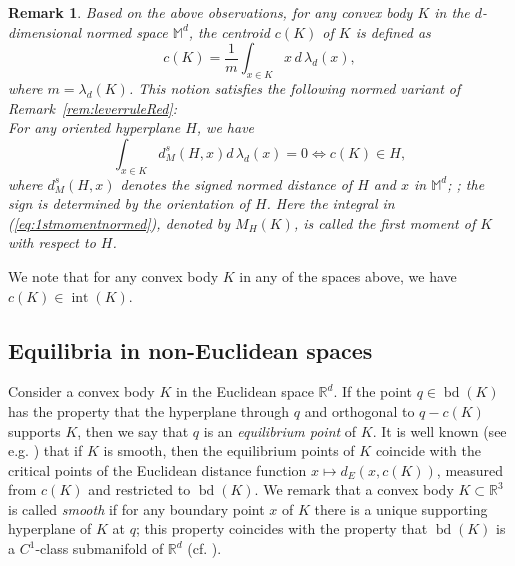 \documentclass[twoside]{amsart}
\theoremstyle{plain}
\newtheorem{remark}[theorem]{Remark}
\theoremstyle{definition}
\numberwithin{equation}{section}
\renewcommand{\Re}{\mathbb R}
\newcommand{\MM}{\mathbb{M}}
\DeclareMathOperator{\inter}{int}
\DeclareMathOperator{\bd}{bd}
\begin{document}
\begin{remark}\label{rem:normedcentroid}
Based on the above observations, for any convex body $K$ in the $d$-dimensional normed space $\MM^d$, the \emph{centroid} $c(K)$ of $K$ is defined as
\begin{equation}\label{eq:centroidMMd}
c(K) = \frac{1}{m} \int_{x \in K} x \, d \, \lambda_d(x),
\end{equation}
where $m=\lambda_d(K)$. This notion satisfies the following normed variant of Remark~\ref{rem:leverruleRed}:\\
For any oriented hyperplane $H$, we have
\begin{equation}\label{eq:1stmomentnormed}
\int_{x \in K} d_{M}^s(H,x) d \, \lambda_d(x) = 0 \Longleftrightarrow c(K) \in H,
\end{equation}
where $d_M^s(H,x)$ denotes the signed normed distance of $H$ and $x$ in $\MM^d$; ; the sign is determined by the orientation of $H$. Here the integral in (\ref{eq:1stmomentnormed}), denoted by $M_H(K)$, is called the \emph{first moment} of $K$ with respect to $H$.
\end{remark}

We note that for any convex body $K$ in any of the spaces above, we have $c(K) \in \inter(K)$.

\subsection{Equilibria in non-Euclidean spaces}\label{subsec:equilibria}

Consider a convex body $K$ in the Euclidean space $\Re^d$. If the point $q \in \bd(K)$ has the property that the hyperplane through $q$ and orthogonal to $q-c(K)$ supports $K$, then we say that $q$ is an \emph{equilibrium point} of $K$. It is well known (see e.g. \cite{DLS, DLV, Langi22}) that if $K$ is smooth, then the equilibrium points of $K$ coincide with the critical points of the Euclidean distance function $x \mapsto d_E(x,c(K))$, measured from $c(K)$ and restricted to $\bd (K)$.
We remark that a convex body $K \subset \Re^3$ is called \emph{smooth} if for any boundary point $x$ of $K$ there is a unique supporting hyperplane of $K$ at $q$; this property coincides with the property that $\bd(K)$ is  a $C^1$-class submanifold of $\Re^d$ (cf. \cite{Schneider}).
\end{document}
